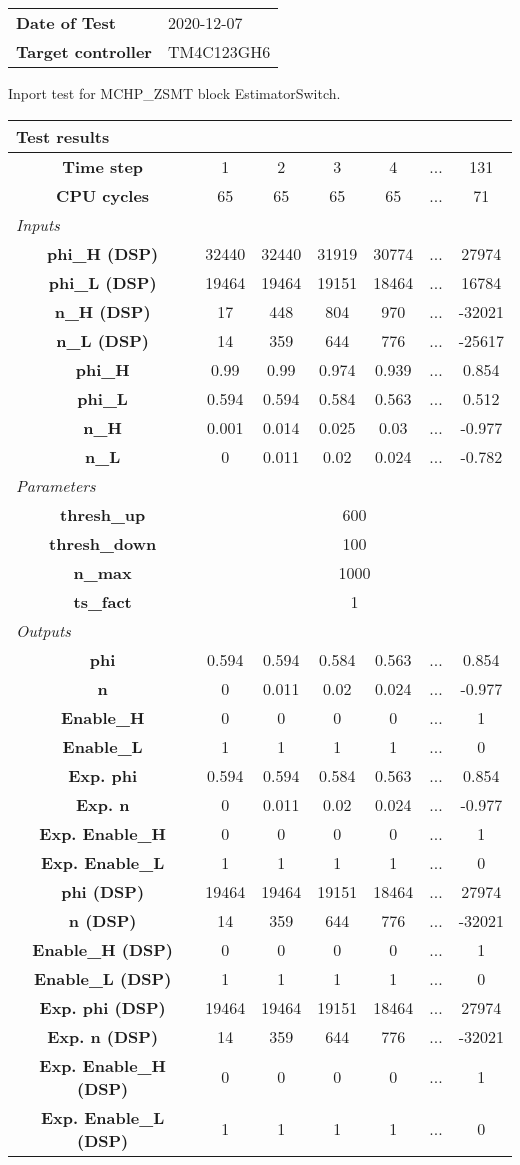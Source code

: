 \begin{tabular}{l l}
\textbf{Date of Test} & 2020-12-07 \tabularnewline
\textbf{Target controller} & TM4C123GH6 \tabularnewline
\end{tabular}
\vspace{1ex}
Inport test for MCHP_ZSMT block EstimatorSwitch.

\vspace{1em}
\begin{tabularx}{\textwidth}{|c|c|c|c|c|>{\centering\arraybackslash}X|c|}
\hline
\multicolumn{7}{|l|}{\cellcolor[gray]{0.8}\textbf{Test results}} \tabularnewline \hline
\textbf{Time step} & 1 & 2 & 3 & 4 & ... & 131 \tabularnewline \hline
\textbf{CPU cycles} & 65 & 65 & 65 & 65 & ... & 71 \tabularnewline \hline
\multicolumn{7}{|l|}{\cellcolor[gray]{0.9}\textit{Inputs}} \tabularnewline \hline
\textbf{phi\_H (DSP)} & 32440 & 32440 & 31919 & 30774 & ... & 27974 \tabularnewline \hline
\textbf{phi\_L (DSP)} & 19464 & 19464 & 19151 & 18464 & ... & 16784 \tabularnewline \hline
\textbf{n\_H (DSP)} & 17 & 448 & 804 & 970 & ... & -32021 \tabularnewline \hline
\textbf{n\_L (DSP)} & 14 & 359 & 644 & 776 & ... & -25617 \tabularnewline \hline
\textbf{phi\_H} & 0.99 & 0.99 & 0.974 & 0.939 & ... & 0.854 \tabularnewline \hline
\textbf{phi\_L} & 0.594 & 0.594 & 0.584 & 0.563 & ... & 0.512 \tabularnewline \hline
\textbf{n\_H} & 0.001 & 0.014 & 0.025 & 0.03 & ... & -0.977 \tabularnewline \hline
\textbf{n\_L} & 0 & 0.011 & 0.02 & 0.024 & ... & -0.782 \tabularnewline \hline
\multicolumn{7}{|l|}{\cellcolor[gray]{0.9}\textit{Parameters}} \tabularnewline \hline
\textbf{thresh\_up} & \multicolumn{6}{c|}{600} \tabularnewline \hline
\textbf{thresh\_down} & \multicolumn{6}{c|}{100} \tabularnewline \hline
\textbf{n\_max} & \multicolumn{6}{c|}{1000} \tabularnewline \hline
\textbf{ts\_fact} & \multicolumn{6}{c|}{1} \tabularnewline \hline
\multicolumn{7}{|l|}{\cellcolor[gray]{0.9}\textit{Outputs}} \tabularnewline \hline
\textbf{phi} & 0.594 & 0.594 & 0.584 & 0.563 & ... & 0.854 \tabularnewline \hline
\textbf{n} & 0 & 0.011 & 0.02 & 0.024 & ... & -0.977 \tabularnewline \hline
\textbf{Enable\_H} & 0 & 0 & 0 & 0 & ... & 1 \tabularnewline \hline
\textbf{Enable\_L} & 1 & 1 & 1 & 1 & ... & 0 \tabularnewline \hline
\textbf{Exp. phi} & 0.594 & 0.594 & 0.584 & 0.563 & ... & 0.854 \tabularnewline \hline
\textbf{Exp. n} & 0 & 0.011 & 0.02 & 0.024 & ... & -0.977 \tabularnewline \hline
\textbf{Exp. Enable\_H} & 0 & 0 & 0 & 0 & ... & 1 \tabularnewline \hline
\textbf{Exp. Enable\_L} & 1 & 1 & 1 & 1 & ... & 0 \tabularnewline \hline
\textbf{phi (DSP)} & 19464 & 19464 & 19151 & 18464 & ... & 27974 \tabularnewline \hline
\textbf{n (DSP)} & 14 & 359 & 644 & 776 & ... & -32021 \tabularnewline \hline
\textbf{Enable\_H (DSP)} & 0 & 0 & 0 & 0 & ... & 1 \tabularnewline \hline
\textbf{Enable\_L (DSP)} & 1 & 1 & 1 & 1 & ... & 0 \tabularnewline \hline
\textbf{Exp. phi (DSP)} & 19464 & 19464 & 19151 & 18464 & ... & 27974 \tabularnewline \hline
\textbf{Exp. n (DSP)} & 14 & 359 & 644 & 776 & ... & -32021 \tabularnewline \hline
\textbf{Exp. Enable\_H (DSP)} & 0 & 0 & 0 & 0 & ... & 1 \tabularnewline \hline
\textbf{Exp. Enable\_L (DSP)} & 1 & 1 & 1 & 1 & ... & 0 \tabularnewline \hline
\end{tabularx}

